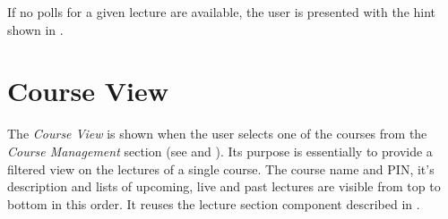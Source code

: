 If no polls for a given lecture are available, the user is presented with the hint shown in \todogrf.

\section{Course View}
\label{section:soa:courseview}

The \emph{Course View} is shown when the user selects one of the courses from the \emph{Course Management} section (see  and ). Its purpose is essentially to provide a filtered view on the lectures of a single course.
The course name and PIN, it's description and lists of upcoming, live and past lectures are visible from top to bottom in this order. It reuses the lecture section component described in .

